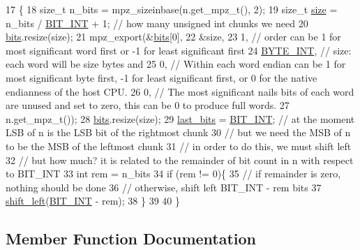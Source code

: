 \begin{DoxyCode}
17                                     \{
18   \textcolor{keywordtype}{size\_t} n\_bits = mpz\_sizeinbase(n.get\_mpz\_t(), 2);
19   \textcolor{keywordtype}{size\_t} \hyperlink{classbit__pipe_a4bdc57f1f598bfad0eaa40860f17000c}{size} = n\_bits / \hyperlink{bitstream_8h_afcadf5aa65c5159bfb96c4d82ebc0a5d}{BIT\_INT} + 1; \textcolor{comment}{// how many unsigned int chunks we need}
20   \hyperlink{classbit__pipe_a86f38af1e9736b053728033490476b50}{bits}.resize(size);
21   mpz\_export(&\hyperlink{classbit__pipe_a86f38af1e9736b053728033490476b50}{bits}[0],
22              &size,
23              1, \textcolor{comment}{// order can be 1 for most significant word first or -1 for least significant first}
24              \hyperlink{bitstream_8h_adcaf4dd854153bb193477f88f921eb36}{BYTE\_INT}, \textcolor{comment}{// size: each word will be size bytes and}
25              0, \textcolor{comment}{// Within each word endian can be 1 for most significant byte first, -1 for least
       significant first, or 0 for the native endianness of the host CPU.}
26              0, \textcolor{comment}{// The most significant nails bits of each word are unused and set to zero, this can be 0
       to produce full words.}
27              n.get\_mpz\_t());
28   \hyperlink{classbit__pipe_a86f38af1e9736b053728033490476b50}{bits}.resize(size);
29   \hyperlink{classbit__pipe_a0f3e84b02751803adaab499b5dad86fe}{last\_bits} = \hyperlink{bitstream_8h_afcadf5aa65c5159bfb96c4d82ebc0a5d}{BIT\_INT}; \textcolor{comment}{// at the moment LSB of n is the LSB bit of the rightmost chunk}
30   \textcolor{comment}{// but we need the MSB of n to be the MSB of the leftmost chunk}
31   \textcolor{comment}{// in order to do this, we must shift left}
32   \textcolor{comment}{// but how much? it is related to the remainder of bit count in n with respect to BIT\_INT}
33   \textcolor{keywordtype}{int} rem = n\_bits %
34   \textcolor{keywordflow}{if} (rem != 0)\{
35     \textcolor{comment}{// if remainder is zero, nothing should be done}
36     \textcolor{comment}{// otherwise, shift left BIT\_INT - rem bits}
37     \hyperlink{classbit__pipe_a148fab2b6b3ee730fbaa52539d5a4d74}{shift\_left}(\hyperlink{bitstream_8h_afcadf5aa65c5159bfb96c4d82ebc0a5d}{BIT\_INT} - rem);
38   \}
39   
40 \}
\end{DoxyCode}


\subsection{Member Function Documentation}
\mbox{\label{classbit__pipe_a0b14715c897cba1713a0ea19ea2996d8}} 
